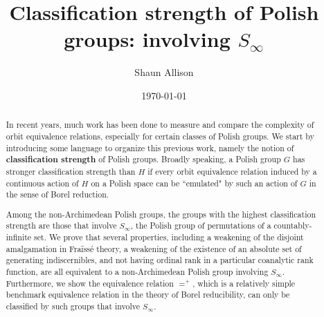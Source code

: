 \documentclass[12pt]{amsart}
\theoremstyle{plain}
\theoremstyle{definition}
\begin{document}
\title{Classification strength of Polish groups: involving $S_\infty$}
\date{\today}
\author{Shaun Allison}
\address{Department of Mathematics, University of Toronto}






\begin{abstract}
    In recent years, much work has been done to measure and compare the complexity of orbit equivalence relations, especially for certain classes of Polish groups.
    We start by introducing some language to organize this previous work, namely the notion of \textbf{classification strength} of Polish groups.
    Broadly speaking, a Polish group $G$ has stronger classification strength than $H$ if every orbit equivalence relation induced by a continuous action of $H$ on a Polish space can be ``emulated" by such an action of $G$ in the sense of Borel reduction.

    Among the non-Archimedean Polish groups, the groups with the highest classification strength are those that involve $S_\infty$, the Polish group of permutations of a countably-infinite set.
    We prove that several properties, including a weakening of the disjoint amalgamation in Fra\"{i}ss\'{e} theory, a weakening of the existence of an absolute set of generating indiscernibles, and not having ordinal rank in a particular coanalytic rank function, are all equivalent to a non-Archimedean Polish group involving $S_\infty$.
    Furthermore, we show the equivalence relation $=^+$, which is a relatively simple benchmark equivalence relation in the theory of Borel reducibility, can only be classified by such groups that involve $S_\infty$.
\end{abstract}

\maketitle
\end{document}
